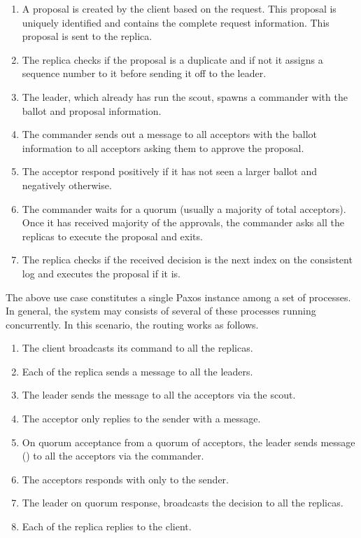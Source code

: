 \begin{enumerate}
    \item A proposal is created by the client based on the request. This
      proposal is uniquely identified and contains the complete request
      information. This proposal is sent to the replica.
    \item The replica checks if the proposal is a duplicate and if not it
      assigns a sequence number%
      to it before sending it off to the leader.
    \item The leader, which already has run the scout, spawns a commander with
      the ballot and proposal information.
    \item The commander sends out a message to all acceptors with the ballot
      information to all acceptors asking them to approve the proposal.
    \item The acceptor respond positively if it has not seen a larger
      ballot and negatively otherwise.
    \item The commander waits for a quorum (usually a majority of total
      acceptors). Once it has received majority of the approvals,
      the commander asks all the replicas to execute the proposal and exits.
    \item The replica checks if the received decision is the next index on
      the consistent log and executes the proposal if it is.
\end{enumerate}

The above use case constitutes a single Paxos instance among a set of processes.
In general, the system may consists of several of these processes running
concurrently. In this scenario, the routing works as follows.

\begin{enumerate}
  \item The client broadcasts its command to all the replicas.
  \item Each of the replica sends a  message to all the leaders.
  \item The leader sends the  message to all the acceptors via the
    scout.
  \item The acceptor only replies to the sender with a  message.
  \item On quorum acceptance from a quorum of acceptors, the leader sends
     message () to all the acceptors via the commander.
  \item The acceptors responds with  only to the sender.
  \item The leader on quorum response, broadcasts the decision to all the
    replicas.
  \item Each of the replica replies to the client.
\end{enumerate}

